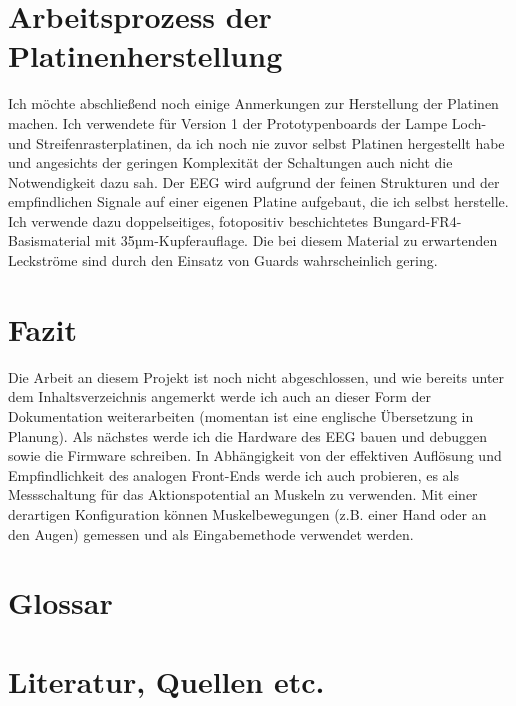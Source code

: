 \documentclass[12pt,a4paper,notitlepage]{article}
\begin{document}
\section{Arbeitsprozess der Platinenherstellung}
Ich möchte abschließend noch einige Anmerkungen zur Herstellung der Platinen machen. Ich verwendete für Version 1 der Prototypenboards der Lampe Loch- und Streifenrasterplatinen, da ich noch nie zuvor selbst Platinen hergestellt habe und angesichts der geringen Komplexität der Schaltungen auch nicht die Notwendigkeit dazu sah. Der EEG wird aufgrund der feinen Strukturen und der empfindlichen Signale auf einer eigenen Platine aufgebaut, die ich selbst herstelle. Ich verwende dazu doppelseitiges, fotopositiv beschichtetes Bungard-FR4-Basismaterial mit 35µm-Kupferauflage. Die bei diesem Material zu erwartenden Leckströme sind durch den Einsatz von Guards wahrscheinlich gering\cite{BUNGARD1,ANALOG1,ANALOG2,MAXIM56,MAXIM55,MAXIM52}.

\section{Fazit}
Die Arbeit an diesem Projekt ist noch nicht abgeschlossen, und wie bereits unter dem Inhaltsverzeichnis angemerkt werde ich auch an dieser Form der Dokumentation weiterarbeiten (momentan ist eine englische Übersetzung in Planung). Als nächstes werde ich die Hardware des \gls{EEG} bauen und debuggen sowie die Firmware schreiben. In Abhängigkeit von der effektiven Auflösung und Empfindlichkeit des analogen Front-Ends werde ich auch probieren, es als Messschaltung für das Aktionspotential an Muskeln zu verwenden. Mit einer derartigen Konfiguration können Muskelbewegungen (z.B. einer Hand oder an den Augen) gemessen und als Eingabemethode verwendet werden\cite{WP21,MULDER1}.

\appendix
\section{Glossar}
\glsaddall
\printglossary[type=\acronymtype,title={Abkürzungen}]
\printglossary[title={Begriffserklärungen}]
\section{Literatur, Quellen etc.}
\nocite{STELTZ1}
\nocite{TEXAS2,TEXAS3,TEXAS4,TEXAS5,TEXAS6,TEXAS7,TEXAS8,TEXAS9}
\nocite{MAXIM46,MAXIM48}
\nocite{MAXIM75,MAXIM73,MAXIM72,MAXIM71,MAXIM69,MAXIM68,MAXIM67,MAXIM66,MAXIM65,MAXIM62,MAXIM57,MAXIM54,MAXIM53,MAXIM51,MAXIM47}
\nocite{MAXIM50}

\renewcommand{\refname}{}

\end{document}
